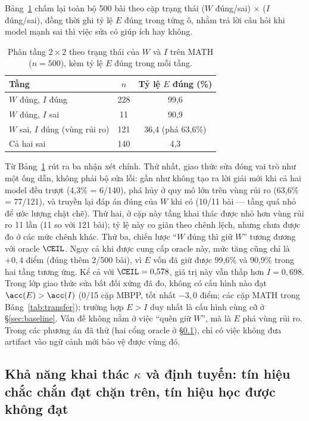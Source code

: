 Bảng~\ref{tab:222} chấm lại toàn bộ 500 bài theo cặp trạng thái ($W$ đúng/sai) $\times$ ($I$ đúng/sai), đồng thời ghi tỷ lệ $E$ đúng trong từng ô, nhằm trả lời câu hỏi khi model mạnh sai thì việc sửa có giúp ích hay không.

\begin{table}[htbp]
\centering
\small
\begin{tabular}{@{}l c c@{}}
\toprule
Tầng & $n$ & Tỷ lệ $E$ đúng (\%) \\
\midrule
$W$ đúng, $I$ đúng & 228 & 99,6\\
$W$ đúng, $I$ sai & 11 & 90,9\\
$W$ sai, $I$ đúng (vùng rủi ro) & 121 & 36,4 \quad (phá 63,6\%)\\
Cả hai sai & 140 & 4,3\\
\bottomrule
\end{tabular}
\caption{Phân tầng $2\times 2$ theo trạng thái của $W$ và $I$ trên MATH ($n=500$), kèm tỷ lệ $E$ đúng trong mỗi tầng.}
\label{tab:222}
\end{table}

Từ Bảng~\ref{tab:222} rút ra ba nhận xét chính. Thứ nhất, giao thức sửa đóng vai trò như một ống dẫn, không phải bộ sửa lỗi: gần như không tạo ra lời giải mới khi cả hai model đều trượt (4,3\% = 6/140), phá hủy ở quy mô lớn trên vùng rủi ro (63,6\% = 77/121), và truyền lại đáp án đúng của $W$ khi có (10/11 bài --- tầng quá nhỏ để ước lượng chặt chẽ). Thứ hai, ở cặp này tầng khai thác được nhỏ hơn vùng rủi ro 11 lần (11 so với 121 bài); tỷ lệ này co giãn theo chênh lệch, nhưng chưa được đo ở các mức chênh khác. Thứ ba, chiến lược “$W$ đúng thì giữ $W$” tương đương với oracle $\CEIL$. Ngay cả khi được cung cấp oracle này, mức tăng cũng chỉ là $+0{,}4$ điểm (đúng thêm 2/500 bài), vì $E$ vốn đã giữ được 99,6\% và 90,9\% trong hai tầng tương ứng. Kể cả với $\CEIL = 0{,}578$, giá trị này vẫn thấp hơn $I = 0{,}698$. Trong lớp giao thức sửa bất đối xứng đã đo, không có cấu hình nào đạt $\acc(E) > \acc(I)$ (0/15 cặp MBPP, tốt nhất $-3{,}0$ điểm; các cặp MATH trong Bảng~\ref{tab:transfer}); trường hợp $E>I$ duy nhất là cấu hình cùng cỡ ở \S\ref{sec:baseline}. Vấn đề không nằm ở việc “quên giữ $W$”, mà là $E$ phá vùng rủi ro. Trong các phương án đã thử (hai cổng oracle ở \S\ref{sec:kappa}), chỉ có việc không đưa artifact vào ngữ cảnh mới bảo vệ được vùng đó.

\subsection{Khả năng khai thác $\kappa$ và định tuyến: tín hiệu chắc chắn đạt chặn trên, tín hiệu học được không đạt}\label{sec:kappa}

